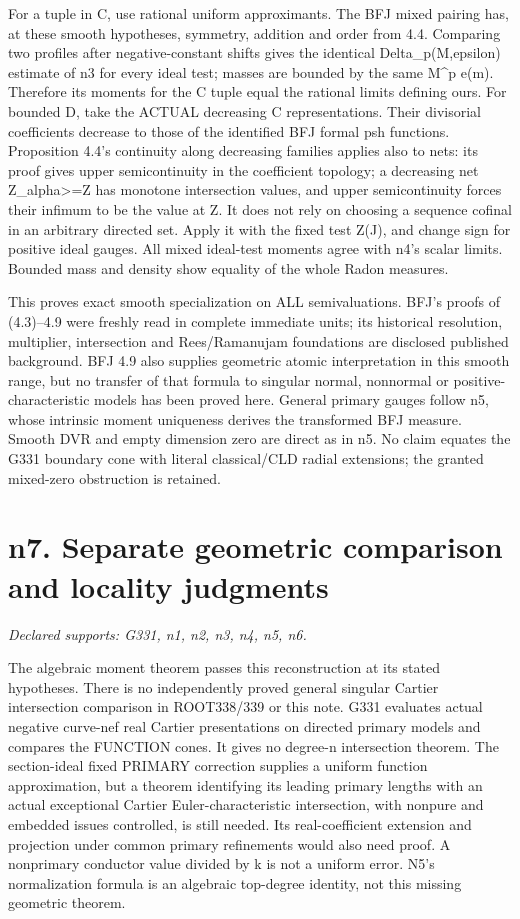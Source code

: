 \documentclass[11pt]{article}
\begin{document}
For a tuple in C, use rational uniform approximants. The BFJ mixed pairing has, at these smooth hypotheses, symmetry, addition and order from 4.4. Comparing two profiles after negative-constant shifts gives the identical Delta\_p(M,epsilon) estimate of n3 for every ideal test; masses are bounded by the same M\textasciicircum{}p e(m). Therefore its moments for the C tuple equal the rational limits defining ours. For bounded D, take the ACTUAL decreasing C representations. Their divisorial coefficients decrease to those of the identified BFJ formal psh functions. Proposition 4.4's continuity along decreasing families applies also to nets: its proof gives upper semicontinuity in the coefficient topology; a decreasing net Z\_alpha>=Z has monotone intersection values, and upper semicontinuity forces their infimum to be the value at Z. It does not rely on choosing a sequence cofinal in an arbitrary directed set. Apply it with the fixed test Z(J), and change sign for positive ideal gauges. All mixed ideal-test moments agree with n4's scalar limits. Bounded mass and density show equality of the whole Radon measures.

This proves exact smooth specialization on ALL semivaluations. BFJ's proofs of (4.3)--4.9 were freshly read in complete immediate units; its historical resolution, multiplier, intersection and Rees/Ramanujam foundations are disclosed published background. BFJ 4.9 also supplies geometric atomic interpretation in this smooth range, but no transfer of that formula to singular normal, nonnormal or positive-characteristic models has been proved here. General primary gauges follow n5, whose intrinsic moment uniqueness derives the transformed BFJ measure. Smooth DVR and empty dimension zero are direct as in n5. No claim equates the G331 boundary cone with literal classical/CLD radial extensions; the granted mixed-zero obstruction is retained.

\section{n7. Separate geometric comparison and locality judgments}
\textit{Declared supports: G331, n1, n2, n3, n4, n5, n6.}

The algebraic moment theorem passes this reconstruction at its stated hypotheses. There is no independently proved general singular Cartier intersection comparison in ROOT338/339 or this note. G331 evaluates actual negative curve-nef real Cartier presentations on directed primary models and compares the FUNCTION cones. It gives no degree-n intersection theorem. The section-ideal fixed PRIMARY correction supplies a uniform function approximation, but a theorem identifying its leading primary lengths with an actual exceptional Cartier Euler-characteristic intersection, with nonpure and embedded issues controlled, is still needed. Its real-coefficient extension and projection under common primary refinements would also need proof. A nonprimary conductor value divided by k is not a uniform error. N5's normalization formula is an algebraic top-degree identity, not this missing geometric theorem.
\end{document}
